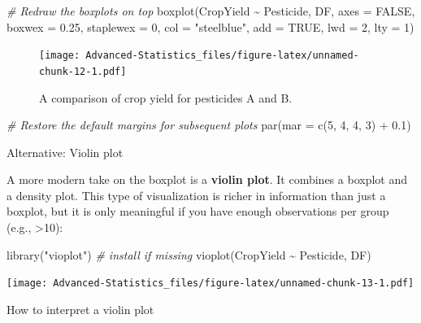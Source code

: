 \documentclass[
]{book}
\newenvironment{Shaded}{\begin{snugshade}}{\end{snugshade}}
\newcommand{\AttributeTok}[1]{\textcolor[rgb]{0.77,0.63,0.00}{#1}}
\newcommand{\CommentTok}[1]{\textcolor[rgb]{0.56,0.35,0.01}{\textit{#1}}}
\newcommand{\ConstantTok}[1]{\textcolor[rgb]{0.00,0.00,0.00}{#1}}
\newcommand{\DecValTok}[1]{\textcolor[rgb]{0.00,0.00,0.81}{#1}}
\newcommand{\FloatTok}[1]{\textcolor[rgb]{0.00,0.00,0.81}{#1}}
\newcommand{\FunctionTok}[1]{\textcolor[rgb]{0.00,0.00,0.00}{#1}}
\newcommand{\NormalTok}[1]{#1}
\newcommand{\SpecialCharTok}[1]{\textcolor[rgb]{0.00,0.00,0.00}{#1}}
\newcommand{\StringTok}[1]{\textcolor[rgb]{0.31,0.60,0.02}{#1}}
\begin{document}
\begin{Shaded}
\begin{Highlighting}[]
\CommentTok{\# Redraw the boxplots on top}
\FunctionTok{boxplot}\NormalTok{(CropYield }\SpecialCharTok{\textasciitilde{}}\NormalTok{ Pesticide, DF, }\AttributeTok{axes =} \ConstantTok{FALSE}\NormalTok{, }\AttributeTok{boxwex =} \FloatTok{0.25}\NormalTok{, }\AttributeTok{staplewex =} \DecValTok{0}\NormalTok{,}
        \AttributeTok{col =} \StringTok{"steelblue"}\NormalTok{, }\AttributeTok{add =} \ConstantTok{TRUE}\NormalTok{, }\AttributeTok{lwd =} \DecValTok{2}\NormalTok{, }\AttributeTok{lty =} \DecValTok{1}\NormalTok{)}
\end{Highlighting}
\end{Shaded}

\begin{figure}
\centering
\texttt{[image: Advanced-Statistics\_files/figure-latex/unnamed-chunk-12-1.pdf]}
\caption{\label{fig:unnamed-chunk-12}A comparison of crop yield for pesticides A and B.}
\end{figure}

\begin{Shaded}
\begin{Highlighting}[]
\CommentTok{\# Restore the default margins for subsequent plots}
\FunctionTok{par}\NormalTok{(}\AttributeTok{mar =} \FunctionTok{c}\NormalTok{(}\DecValTok{5}\NormalTok{, }\DecValTok{4}\NormalTok{, }\DecValTok{4}\NormalTok{, }\DecValTok{3}\NormalTok{) }\SpecialCharTok{+} \FloatTok{0.1}\NormalTok{)}
\end{Highlighting}
\end{Shaded}

Alternative: Violin plot

A more modern take on the boxplot is a \textbf{violin plot}. It combines a boxplot and a density plot. This type of visualization is richer in information than just a boxplot, but it is only meaningful if you have enough observations per group (e.g., \textgreater10):

\begin{Shaded}
\begin{Highlighting}[]
\FunctionTok{library}\NormalTok{(}\StringTok{"vioplot"}\NormalTok{) }\CommentTok{\# install if missing}
\FunctionTok{vioplot}\NormalTok{(CropYield }\SpecialCharTok{\textasciitilde{}}\NormalTok{ Pesticide, DF)}
\end{Highlighting}
\end{Shaded}

\texttt{[image: Advanced-Statistics\_files/figure-latex/unnamed-chunk-13-1.pdf]}

How to interpret a violin plot
\end{document}
